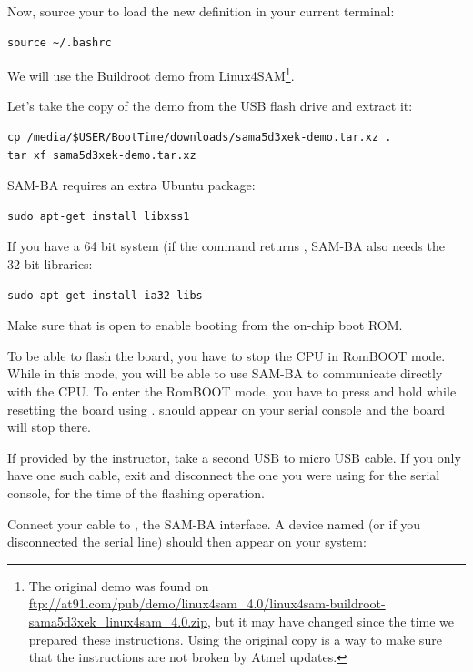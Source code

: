 Now, source your  to load the new definition in your
current terminal:
\begin{verbatim}
source ~/.bashrc
\end{verbatim}

We will use the Buildroot demo from Linux4SAM\footnote{The original demo
was found on
\url{ftp://at91.com/pub/demo/linux4sam_4.0/linux4sam-buildroot-sama5d3xek_linux4sam_4.0.zip},
but it may have changed since the time we prepared these instructions.
Using the original copy is a way to make sure that the instructions are
not broken by Atmel updates.}.

Let's take the copy of the demo from the USB flash drive and extract it:

\begin{verbatim}
cp /media/$USER/BootTime/downloads/sama5d3xek-demo.tar.xz .
tar xf sama5d3xek-demo.tar.xz
\end{verbatim}

SAM-BA requires an extra Ubuntu package:

\begin{verbatim}
sudo apt-get install libxss1
\end{verbatim}

If you have a 64 bit system (if the  command returns
, SAM-BA also needs the 32-bit libraries:

\begin{verbatim}
sudo apt-get install ia32-libs
\end{verbatim}

Make sure that  is open to enable booting from the
on-chip boot ROM.

To be able to flash the board, you have to stop the CPU in RomBOOT
mode. While in this mode, you will be able to use SAM-BA to
communicate directly with the CPU. To enter the RomBOOT mode, you have to
press and hold  while resetting the board using .
 should appear on your serial console and the board will
stop there.

If provided by the instructor, take a second USB to micro USB cable.
If you only have one such cable, exit  and disconnect
the one you were using for the serial console, for the time of the
flashing operation.

Connect your cable to , the SAM-BA interface. A device named
 (or  if you disconnected the
serial line) should then appear on your system:

